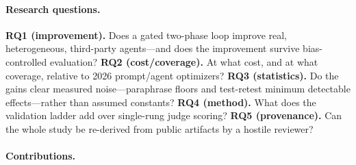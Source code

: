 \documentclass[11pt]{article}
\begin{document}
\paragraph{Research questions.}
\textbf{RQ1 (improvement).} Does a gated two-phase loop improve real,
heterogeneous, third-party agents---and does the improvement survive
bias-controlled evaluation? \textbf{RQ2 (cost/coverage).} At what cost, and at
what coverage, relative to 2026 prompt/agent optimizers? \textbf{RQ3
(statistics).} Do the gains clear measured noise---paraphrase floors and
test-retest minimum detectable effects---rather than assumed constants?
\textbf{RQ4 (method).} What does the validation ladder add over single-rung
judge scoring? \textbf{RQ5 (provenance).} Can the whole study be re-derived
from public artifacts by a hostile reviewer?

\paragraph{Contributions.}
\end{document}
